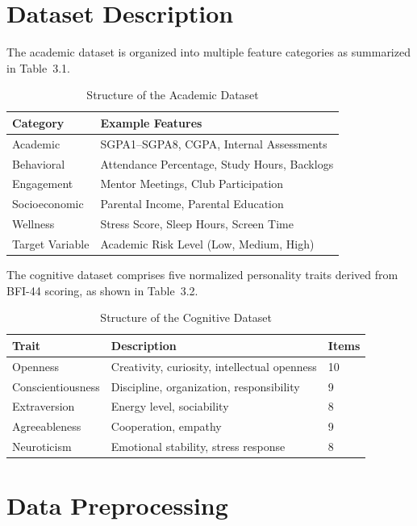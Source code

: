 \documentclass[12pt,a4paper]{report}
\begin{document}
\section{Dataset Description}

The academic dataset is organized into multiple feature categories as summarized in Table~3.1.

\begin{table}[H]
\centering
\caption{Structure of the Academic Dataset}
\label{tab:academic_dataset}
\begin{tabular}{|p{4cm}|p{9cm}|}
\hline
\textbf{Category} & \textbf{Example Features} \\
\hline
Academic & SGPA1–SGPA8, CGPA, Internal Assessments \\
Behavioral & Attendance Percentage, Study Hours, Backlogs \\
Engagement & Mentor Meetings, Club Participation \\
Socioeconomic & Parental Income, Parental Education \\
Wellness & Stress Score, Sleep Hours, Screen Time \\
Target Variable & Academic Risk Level (Low, Medium, High) \\
\hline
\end{tabular}
\end{table}

The cognitive dataset comprises five normalized personality traits derived from BFI-44 scoring, as shown in Table~3.2.

\begin{table}[H]
\centering
\caption{Structure of the Cognitive Dataset}
\label{tab:cognitive_dataset}
\begin{tabular}{|p{4cm}|p{7cm}|p{2cm}|}
\hline
\textbf{Trait} & \textbf{Description} & \textbf{Items} \\
\hline
Openness & Creativity, curiosity, intellectual openness & 10 \\
Conscientiousness & Discipline, organization, responsibility & 9 \\
Extraversion & Energy level, sociability & 8 \\
Agreeableness & Cooperation, empathy & 9 \\
Neuroticism & Emotional stability, stress response & 8 \\
\hline
\end{tabular}
\end{table}

\section{Data Preprocessing}
\end{document}
